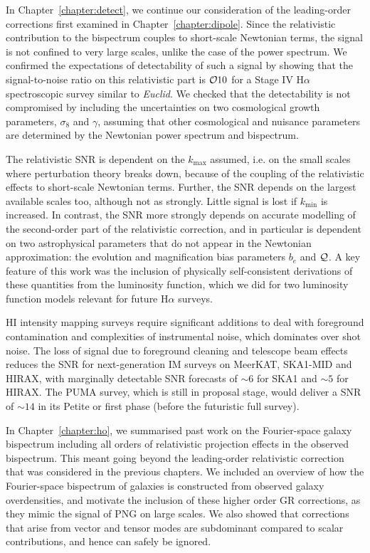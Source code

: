 In Chapter~\ref{chapter:detect}, we continue our consideration of the leading-order corrections first examined in Chapter~\ref{chapter:dipole}. Since the relativistic contribution to the bispectrum couples to short-scale Newtonian terms, the signal is not confined to very large scales, unlike the case of the power spectrum. We confirmed the expectations of detectability of such a signal by showing that the signal-to-noise ratio on this relativistic part is $\mathcal{O} 10$ for a Stage IV H$\alpha$ spectroscopic survey similar to \emph{Euclid}. We checked that the detectability is not compromised by including the uncertainties on two cosmological growth parameters, $\sigma_8$ and $\gamma$, assuming that other cosmological and nuisance parameters are determined by the Newtonian power spectrum and bispectrum. 

The relativistic SNR is dependent on the $k_\mathrm{max}$ assumed, i.e. on the small scales where perturbation theory breaks down, because of the coupling of the relativistic effects to short-scale Newtonian terms. Further, the SNR depends on the largest available scales too, although not as strongly. Little signal is lost if $k_\mathrm{min}$ is increased.  In contrast, the SNR more strongly depends on accurate modelling of the second-order part of the relativistic correction, and in particular is dependent on two astrophysical parameters that do not appear in the Newtonian approximation: the evolution and magnification bias parameters $b_e$ and $\mathcal{Q}$. A key feature of this work was the inclusion of physically self-consistent derivations of these quantities from the luminosity function, which we did for two luminosity function models relevant for future H$\alpha$ surveys.

HI intensity mapping surveys require significant additions to deal with foreground contamination and complexities of instrumental noise, which dominates over shot noise. The loss of signal due to foreground cleaning and telescope beam effects reduces the SNR for next-generation IM surveys on MeerKAT, SKA1-MID and HIRAX, with marginally detectable SNR forecasts of $\sim 6$ for SKA1 and $\sim 5$ for HIRAX. The PUMA survey, which is still in proposal stage, would deliver a SNR of $\sim 14$ in its Petite or first phase (before the futuristic full survey). 

In Chapter~\ref{chapter:ho}, we summarised past work on the Fourier-space galaxy bispectrum including all orders of relativistic projection effects in the observed bispectrum. This meant going beyond the leading-order relativistic correction that was considered in the previous chapters. We included an overview of how the Fourier-space bispectrum of galaxies is constructed from observed galaxy overdensities, and motivate the inclusion of these higher order GR corrections, as they mimic the signal of PNG on large scales. We also showed that corrections that arise from vector and tensor modes are subdominant compared to scalar contributions, and hence can safely be ignored.

